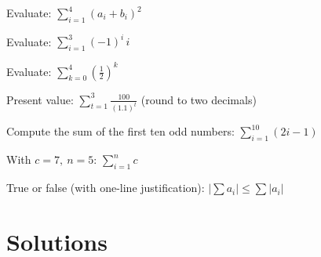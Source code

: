 \begin{problems}
  \item Evaluate: $\displaystyle\sum_{i=1}^{4}(a_{i}+b_{i})^{2}$
  \item Evaluate: $\displaystyle\sum_{i=1}^{3}(-1)^{i}\,i$
  \item Evaluate: $\displaystyle\sum_{k=0}^{4}\left(\frac{1}{2}\right)^{k}$
  \item Present value: $\displaystyle\sum_{t=1}^{3}\frac{100}{(1.1)^{t}}$
        (round to two decimals)
  \item Compute the sum of the first ten odd numbers:
        $\displaystyle\sum_{i=1}^{10}(2i-1)$
  \item With $c=7,\ n=5$: $\displaystyle\sum_{i=1}^{n}c$
  \item True or false (with one-line justification):
        $\displaystyle\left|\sum a_{i}\right|\le\sum|a_{i}|$
\end{problems}

\section{Solutions}

